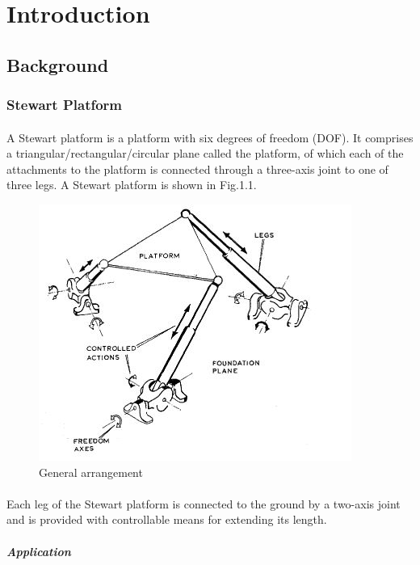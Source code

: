 \section{Introduction}
\label{sec:introduction}
\subsection{Background}
\subsubsection{Stewart Platform}
\paragraph{}A Stewart platform is a platform with six degrees of freedom (DOF). It comprises a triangular/rectangular/circular plane called the platform, of which each of the attachments to the platform is connected through a three-axis joint to one of three legs.
A Stewart platform is shown in Fig.1.1.
\begin{center}
	\begin{figure}[!h]
	\centering
	\includegraphics{Figures/Fig1}
	\caption{General arrangement}
	\end{figure}
\end{center}
\paragraph{}Each leg of the Stewart platform is connected to the ground by a two-axis joint and is provided with controllable means for extending its length.
\subparagraph{Application}
